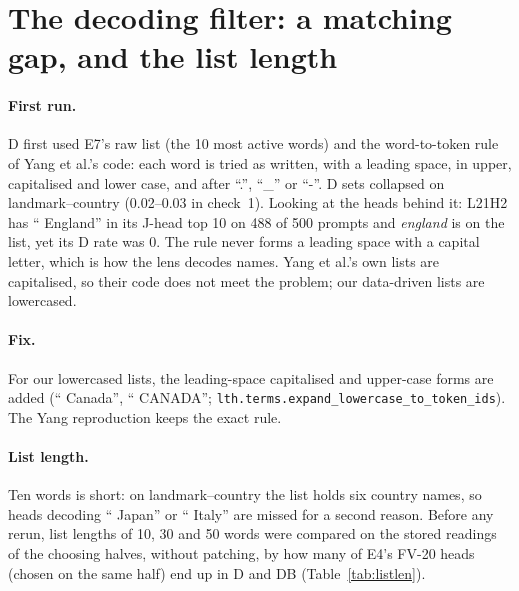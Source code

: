 \documentclass[10pt,a4paper]{article}
\begin{document}
\section{The decoding filter: a matching gap, and the list length}\label{sec:dfix}

\paragraph{First run.} D first used E7's raw list (the 10 most active words) and the word-to-token rule of Yang et al.'s code: each word is tried as written, with a leading space, in upper, capitalised and lower case, and after ``.'', ``\_'' or ``-''. D sets collapsed on landmark--country (0.02--0.03 in check~1). Looking at the heads behind it: L21H2 has `` England'' in its J-head top 10 on 488 of 500 prompts and \emph{england} is on the list, yet its D rate was 0. The rule never forms a leading space with a capital letter, which is how the lens decodes names. Yang et al.'s own lists are capitalised, so their code does not meet the problem; our data-driven lists are lowercased.

\paragraph{Fix.} For our lowercased lists, the leading-space capitalised and upper-case forms are added (`` Canada'', `` CANADA''; \texttt{lth.terms.expand\_lowercase\_to\_token\_ids}). The Yang reproduction keeps the exact rule.

\paragraph{List length.} Ten words is short: on landmark--country the list holds six country names, so heads decoding `` Japan'' or `` Italy'' are missed for a second reason. Before any rerun, list lengths of 10, 30 and 50 words were compared on the stored readings of the choosing halves, without patching, by how many of E4's FV-20 heads (chosen on the same half) end up in D and DB (Table~\ref{tab:listlen}).

\begin{table}[H]\centering\small

\caption{D-filter variants, mean over tasks and folds. Chance: FV-20 heads expected in a random set of the same size. Generic: list words among the 50 words heads decode most on WikiText. Source: \texttt{scripts/e8\_list\_length.py}.}
\label{tab:listlen}
\end{table}
\end{document}
